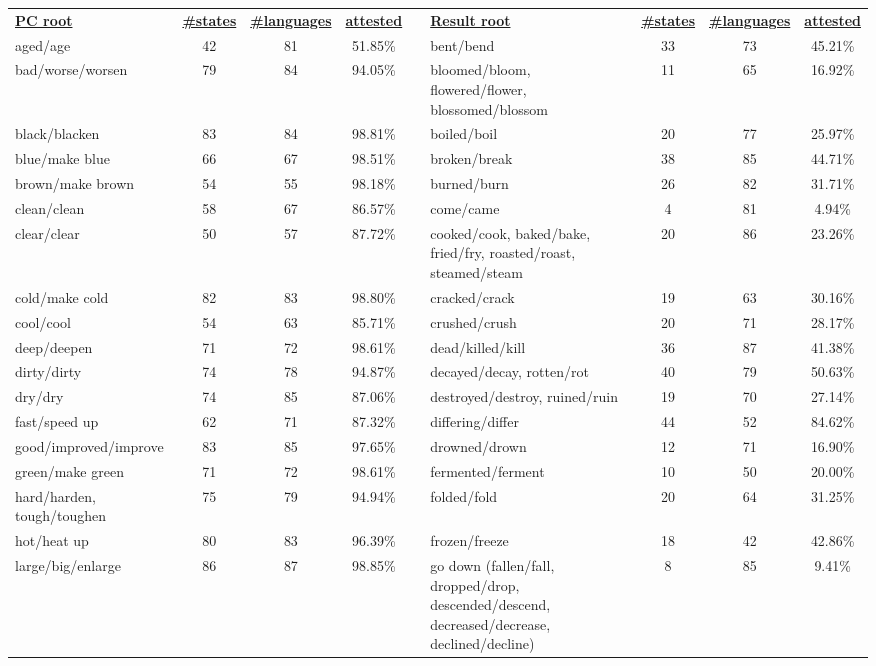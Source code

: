 \begin{tabular}{p{3cm}ccccp{3cm}ccc}
\underline{\textbf{PC root}} & \underline{\textbf{\#states}} & \underline{\textbf{\#languages}} & \underline{\textbf{attested}} & & \underline{\textbf{Result root}} & \underline{\textbf{\#states}} & \underline{\textbf{\#languages}} & \underline{\textbf{attested}} \\
aged/age & 42 & 81 & 51.85\% & & bent/bend & 33 & 73 & 45.21\% \\
bad/worse/worsen & 79 & 84 & 94.05\% & & bloomed/bloom, flowered/flower, blossomed/blossom & 11 & 65 & 16.92\% \\
black/blacken & 83 & 84 & 98.81\% & & boiled/boil & 20 & 77 & 25.97\% \\
blue/make blue & 66 & 67 & 98.51\% & & broken/break & 38 & 85 & 44.71\% \\
brown/make brown & 54 & 55 & 98.18\% & & burned/burn & 26 & 82 & 31.71\% \\
clean/clean & 58 & 67 & 86.57\% & & come/came & 4 & 81 & 4.94\% \\
clear/clear & 50 & 57 & 87.72\% & & cooked/cook, baked/bake, fried/fry, roasted/roast, steamed/steam & 20 & 86 & 23.26\% \\
cold/make cold & 82 & 83 & 98.80\% & & cracked/crack & 19 & 63 & 30.16\% \\
cool/cool & 54 & 63 & 85.71\% & & crushed/crush & 20 & 71 & 28.17\% \\
deep/deepen & 71 & 72 & 98.61\% & & dead/killed/kill & 36 & 87 & 41.38\% \\
dirty/dirty & 74 & 78 & 94.87\% & & decayed/decay, rotten/rot & 40 & 79 & 50.63\% \\
dry/dry & 74 & 85 & 87.06\% & & destroyed/destroy, ruined/ruin & 19 & 70 & 27.14\% \\
fast/speed up & 62 & 71 & 87.32\% & & differing/differ & 44 & 52 & 84.62\% \\
good/improved/improve & 83 & 85 & 97.65\% & & drowned/drown & 12 & 71 & 16.90\% \\
green/make green & 71 & 72 & 98.61\% & & fermented/ferment & 10 & 50 & 20.00\% \\
hard/harden, tough/toughen & 75 & 79 & 94.94\% & & folded/fold & 20 & 64 & 31.25\% \\
hot/heat up & 80 & 83 & 96.39\% & & frozen/freeze & 18 & 42 & 42.86\% \\
large/big/enlarge & 86 & 87 & 98.85\% & & go down (fallen/fall, dropped/drop, descended/descend, decreased/decrease, declined/decline) & 8 & 85 & 9.41\% \\

\end{tabular}
